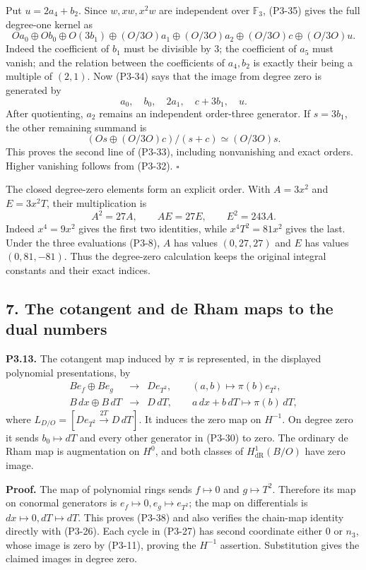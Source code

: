 \documentclass[
]{article}
\begin{document}
Put \(u=2a_4+b_2\). Since \(w,xw,x^2w\) are independent over
\(\mathbb F_3\), (P3-35) gives the full degree-one kernel as \[
Oa_0\oplus Ob_0\oplus O(3b_1)
\oplus(O/3O)a_1\oplus(O/3O)a_2
\oplus(O/3O)c\oplus(O/3O)u.
\tag{P3-36}
\] Indeed the coefficient of \(b_1\) must be divisible by 3; the
coefficient of \(a_5\) must vanish; and the relation between the
coefficients of \(a_4,b_2\) is exactly their being a multiple of
\((2,1)\). Now (P3-34) says that the image from degree zero is generated
by \[
a_0,\quad b_0,\quad 2a_1,\quad c+3b_1,\quad u.
\] After quotienting, \(a_2\) remains an independent order-three
generator. If \(s=3b_1\), the other remaining summand is \[
(Os\oplus(O/3O)c)/(s+c)\simeq(O/3O)s.
\] This proves the second line of (P3-33), including nonvanishing and
exact orders. Higher vanishing follows from (P3-32). \(\square\)

The closed degree-zero elements form an explicit order. With \(A=3x^2\)
and \(E=3x^2T\), their multiplication is \[
A^2=27A,\qquad AE=27E,\qquad E^2=243A.
\tag{P3-37}
\] Indeed \(x^4=9x^2\) gives the first two identities, while
\(x^4T^2=81x^2\) gives the last. Under the three evaluations (P3-8),
\(A\) has values \((0,27,27)\) and \(E\) has values \((0,81,-81)\). Thus
the degree-zero calculation keeps the original integral constants and
their exact indices.

\subsection{7. The cotangent and de Rham maps to the dual
numbers}\label{the-cotangent-and-de-rham-maps-to-the-dual-numbers}

\textbf{P3.13.} The cotangent map induced by \(\pi\) is represented, in
the displayed polynomial presentations, by \[
\begin{array}{rcl}
B e_f\oplus B e_g&\longrightarrow&D e_{T^2},
\qquad(a,b)\longmapsto\pi(b)e_{T^2},\\
B\,dx\oplus B\,dT&\longrightarrow&D\,dT,
\qquad a\,dx+b\,dT\longmapsto\pi(b)\,dT,
\end{array}
\tag{P3-38}
\] where \(L_{D/O}=[D e_{T^2}\xrightarrow{2T}D\,dT]\). It induces the
zero map on \(H^{-1}\). On degree zero it sends \(b_0\mapsto dT\) and
every other generator in (P3-30) to zero. The ordinary de Rham map is
augmentation on \(H^0\), and both classes of \(H^1_{\mathrm{dR}}(B/O)\)
have zero image.

\textbf{Proof.} The map of polynomial rings sends \(f\mapsto0\) and
\(g\mapsto T^2\). Therefore its map on conormal generators is
\(e_f\mapsto0,e_g\mapsto e_{T^2}\); the map on differentials is
\(dx\mapsto0,dT\mapsto dT\). This proves (P3-38) and also verifies the
chain-map identity directly with (P3-26). Each cycle in (P3-27) has
second coordinate either 0 or \(n_3\), whose image is zero by (P3-11),
proving the \(H^{-1}\) assertion. Substitution gives the claimed images
in degree zero.
\end{document}
